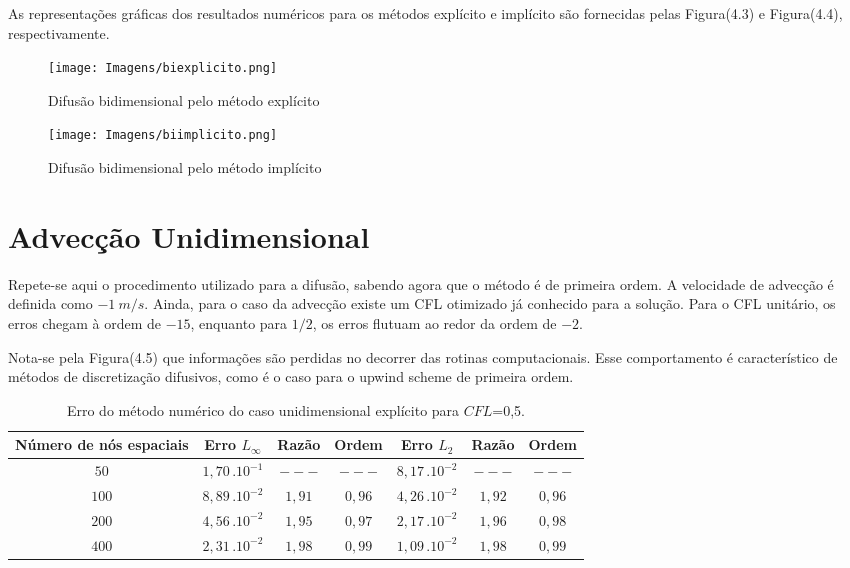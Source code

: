 	As representações gráficas dos resultados numéricos para os métodos explícito e implícito são fornecidas pelas Figura(4.3) e Figura(4.4), respectivamente.

\newpage

\begin{figure}[ht!]
	\label{explicito2}
	\centering
	\texttt{[image: Imagens/biexplicito.png]}
	\caption{Difusão bidimensional pelo método explícito}
\end{figure}

\begin{figure}[ht!]
	\label{implicito10}
	\centering
	\texttt{[image: Imagens/biimplicito.png]}
	\caption{Difusão bidimensional pelo método implícito}
\end{figure}

\newpage

\section{Advecção Unidimensional}
\noindent

	Repete-se aqui o procedimento utilizado para a difusão, sabendo agora que o método é de primeira ordem. A velocidade de advecção é definida como $-1 \ m/s$. Ainda, para o caso da advecção existe um CFL otimizado já conhecido para a solução. Para o CFL unitário, os erros chegam à ordem de $-15$, enquanto para $1/2$, os erros flutuam ao redor da ordem de $-2$. 
	
	Nota-se pela Figura(4.5) que informações são perdidas no decorrer das rotinas computacionais. Esse comportamento é característico de métodos de discretização difusivos, como é o caso para o upwind scheme de primeira ordem. 
	
	\begin{table}[h!]
	\caption{Erro do método numérico do caso unidimensional explícito para $CFL$=0,5.}
	\label{tabela5}
	\centering
	\begin{tabular}{c | c c c | c c c}
		\hline
		Número de nós  espaciais&       Erro $L_\infty$       	& Razão   	 & Ordem   & Erro $L_{2}$ 				& Razão 	  & Ordem  \\ \hline
		$50$ 					&		$1,70 \, . 10^{-1}$     & $---$      & $---$   &       $8,17 \, . 10^{-2}$  & $---$       & $---$    \\ 
		$100$ 					&       $8,89 \, . 10^{-2}$     & $1,91$     & $0,96$  &       $4,26 \, . 10^{-2}$  & $1,92$      & $0,96$    \\ 
		$200$ 					&       $4,56 \, . 10^{-2}$     & $1,95$     & $0,97$  &       $2,17 \, . 10^{-2}$  & $1,96$      & $0,98$    \\ 
		$400$ 					&       $2,31 \, . 10^{-2}$     & $1,98$     & $0,99$  &       $1,09 \, . 10^{-2}$  & $1,98$      & $0,99$    \\ \hline
	\end{tabular}
\end{table}

